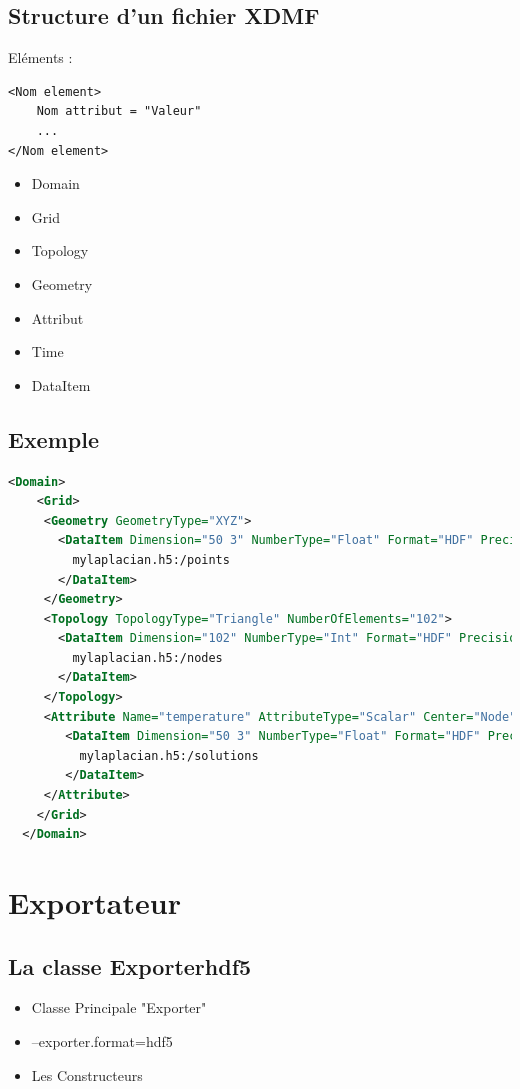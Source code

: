 \documentclass{beamer}
\begin{document}
\subsection{Structure d'un fichier XDMF}
\begin{frame}[fragile]
Eléments :
\begin{verbatim}
<Nom element>
    Nom attribut = "Valeur"
    ...
</Nom element>
\end{verbatim}
\begin{itemize}
\item Domain
\item Grid
\item Topology
\item Geometry
\item Attribut
\item Time
\item DataItem
\end{itemize}
\end{frame}
\subsection{Exemple}
\begin{frame}
\begin{lstlisting}[language=XML]
  <Domain>
    <Grid>
     <Geometry GeometryType="XYZ">
       <DataItem Dimension="50 3" NumberType="Float" Format="HDF" Precision="8">
         mylaplacian.h5:/points
       </DataItem>
     </Geometry>
     <Topology TopologyType="Triangle" NumberOfElements="102">
       <DataItem Dimension="102" NumberType="Int" Format="HDF" Precision="8">
         mylaplacian.h5:/nodes
       </DataItem>
     </Topology>
     <Attribute Name="temperature" AttributeType="Scalar" Center="Node">
        <DataItem Dimension="50 3" NumberType="Float" Format="HDF" Precision="8">
          mylaplacian.h5:/solutions
        </DataItem>
     </Attribute>
    </Grid>
  </Domain>
\end{lstlisting}
\end{frame}

\section{Exportateur}
\subsection{La classe Exporterhdf5}
\begin{frame}
\begin{itemize}
\item Classe Principale "Exporter"
\item --exporter.format=hdf5
\item Les Constructeurs
\end{itemize}
\end{frame}
\end{document}
